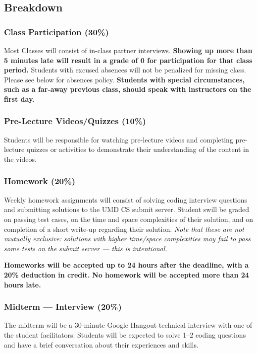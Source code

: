 \documentclass[12pt]{article}
\begin{document}
\subsection*{Breakdown}
\subsubsection*{Class Participation (30\%)}

\noindent Most Classes will consist of in-class partner interviews.
\textbf{Showing up more than 5 minutes late will result in a grade of 0 for participation for that class period.}
Students with excused absences will not be penalized for missing class.
Please see below for absences policy.
\textbf{​Students with special circumstances, such as a far-away previous class, should speak with instructors on the first day.}

\subsubsection*{Pre-Lecture Videos/Quizzes (10\%)}
Students will be responsible for watching pre-lecture videos and
completing pre-lecture quizzes or activities to demonstrate their understanding of the content in the videos.

\subsubsection*{Homework (20\%)}
Weekly homework assignments will consist of solving coding interview questions and submitting solutions to the UMD CS submit server.
Student swill be graded on passing test cases, on the time and space complexities of their solution, and on completion of a short write-up regarding their solution.
{\em Note that these are not mutually exclusive: solutions with higher time/space complexities may fail to pass some tests on the submit server --- this is intentional.}

\textbf{Homeworks will be accepted up to 24 hours after the deadline, with a 20\% deduction in credit.}
\textbf{No homework will be accepted more than 24 hours late.}

\subsubsection*{Midterm --- Interview (20\%)}
The midterm will be a 30-minute Google Hangout technical interview with one of the student facilitators.
Students will be expected to solve 1--2 coding questions and have a brief conversation about their experiences and skills.
\end{document}
